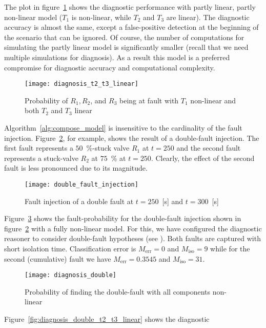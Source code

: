 %
The plot in figure~\ref{fig:diagnosis_t2_t3_linear} shows the
diagnostic performance with partly linear, partly non-linear model
($T_1$ is non-linear, while $T_2$ and $T_3$ are linear). The
diagnostic accuracy is almost the same, except a false-positive
detection at the beginning of the scenario that can be ignored. Of
course, the number of computations for simulating the partly linear
model is significantly smaller (recall that we need multiple
simulations for diagnosis). As a result this model is a preferred
compromise for diagnostic accuracy and computational complexity.
%
\begin{figure}[htb]
  \centering
  \texttt{[image: diagnosis\_t2\_t3\_linear]}
  \caption{Probability of $R_1, R_2$, and $R_3$ being at fault with $T_1$ non-linear and both $T_2$ and $T_3$ linear}
  \label{fig:diagnosis_t2_t3_linear}
\end{figure}
\par
%
Algorithm~\ref{alg:compose_model} is insensitive to the cardinality of
the fault injection. Figure~\ref{fig:double_fault_injection}, for
example, shows the result of a double-fault injection. The first fault
represents a $50$~\%-stuck valve $R_1$ at $t = 250$ and the second
fault represents a stuck-valve $R_2$ at $75$~\% at $t = 250$. Clearly,
the effect of the second fault is less pronounced due to its
magnitude.
%
\begin{figure}[htb]
  \centering
  \texttt{[image: double\_fault\_injection]}
  \caption{Fault injection of a double fault at $t = 250$~[s] and $t = 300$~[s]}
  \label{fig:double_fault_injection}
\end{figure}
\par
Figure~\ref{fig:diagnosis_double} shows the fault-probability for the
double-fault injection shown in
figure~\ref{fig:double_fault_injection} with a fully non-linear
model. For this, we have configured the diagnostic reasoner to
consider double-fault hypotheses (see \cite{feldman13genius}). Both
faults are captured with short isolation time.
Classification error is $M_{\mathrm{err}} = 0$ and
$M_{\mathrm{iso}} = 9$ while for the second (cumulative) fault we have
$M_{\mathrm{err}} = 0.3545$ and $M_{\mathrm{iso}} = 31$.
%
\begin{figure}[htb]
  \centering
  \texttt{[image: diagnosis\_double]}
  \caption{Probability of finding the double-fault with all components non-linear}
  \label{fig:diagnosis_double}
\end{figure}
\par
Figure~\ref{fig:diagnosis_double_t2_t3_linear} shows the diagnostic

